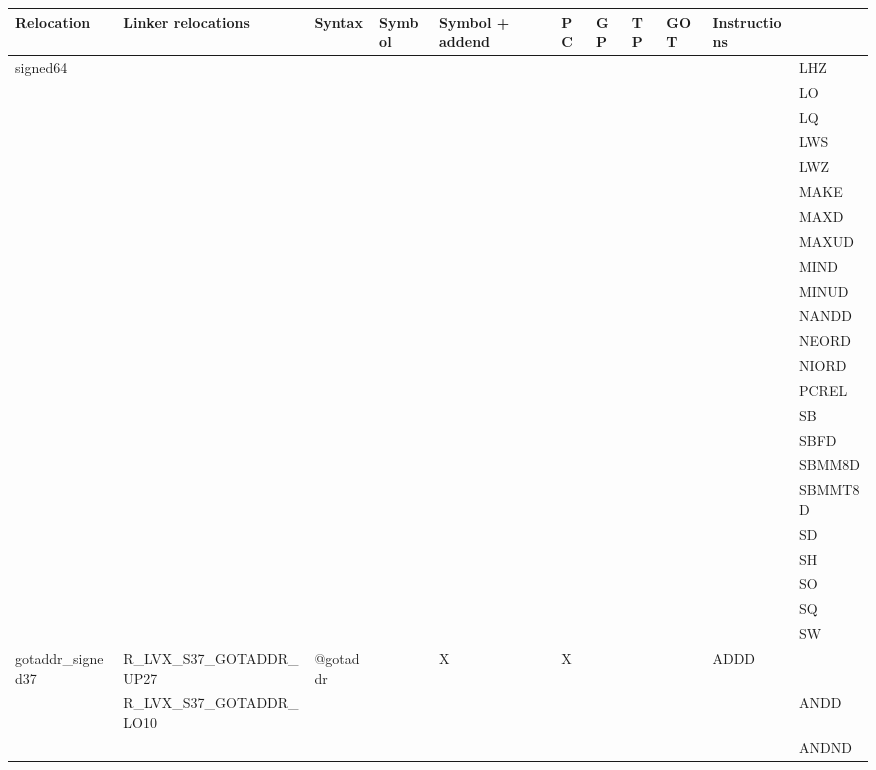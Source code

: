 \smallskip

{\tiny
\begin{tabular}{|l|l|l|l|l|l|l|l|l|l|l|} \hline
\textsf{Relocation} & \textsf{Linker relocations} & \textsf{Syntax} & \textsf{Symbol} & \textsf{Symbol + addend} & \textsf{PC} & \textsf{GP} & \textsf{TP} & \textsf{GOT} & \textsf{Instructions} \\
\hline
\textsf{signed64} & & & & & & & & & & \textsf{LHZ} \\
 & & & & & & & & & & \textsf{LO} \\
 & & & & & & & & & & \textsf{LQ} \\
 & & & & & & & & & & \textsf{LWS} \\
 & & & & & & & & & & \textsf{LWZ} \\
 & & & & & & & & & & \textsf{MAKE} \\
 & & & & & & & & & & \textsf{MAXD} \\
 & & & & & & & & & & \textsf{MAXUD} \\
 & & & & & & & & & & \textsf{MIND} \\
 & & & & & & & & & & \textsf{MINUD} \\
 & & & & & & & & & & \textsf{NANDD} \\
 & & & & & & & & & & \textsf{NEORD} \\
 & & & & & & & & & & \textsf{NIORD} \\
 & & & & & & & & & & \textsf{PCREL} \\
 & & & & & & & & & & \textsf{SB} \\
 & & & & & & & & & & \textsf{SBFD} \\
 & & & & & & & & & & \textsf{SBMM8D} \\
 & & & & & & & & & & \textsf{SBMMT8D} \\
 & & & & & & & & & & \textsf{SD} \\
 & & & & & & & & & & \textsf{SH} \\
 & & & & & & & & & & \textsf{SO} \\
 & & & & & & & & & & \textsf{SQ} \\
 & & & & & & & & & & \textsf{SW} \\
\hline
\textsf{gotaddr\_signed37} & \textsf{R\_LVX\_S37\_GOTADDR\_UP27} & \textsf{@gotaddr} & \textsf{} & \textsf{X} & \textsf{X} & \textsf{} & \textsf{} & \textsf{} & \textsf{ADDD} \\
 & \textsf{R\_LVX\_S37\_GOTADDR\_LO10} & & & & & & & & & \textsf{ANDD} \\
 & & & & & & & & & & \textsf{ANDND} \\

\end{tabular}}
